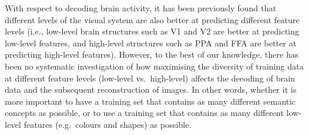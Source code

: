 With respect to decoding brain activity, it has been previously found that different levels of the visual system are also better at predicting different feature levels (i.e., low-level brain structures such as V1 and V2 are better at predicting low-level features, and high-level structures such as PPA and FFA are better at predicting high-level features)\cite{horikawaGenericDecodingSeen2017}. However, to the best of our knowledge, there has been no systematic investigation of how maximising the diversity of training data at different feature levels (low-level vs.\ high-level) affects the decoding of brain data and the subsequent reconstruction of images. In other words, whether it is more important to have a training set that contains as many different semantic concepts as possible, or to use a training set that contains as many different low-level features (e.g.\ colours and shapes) as possible. 






